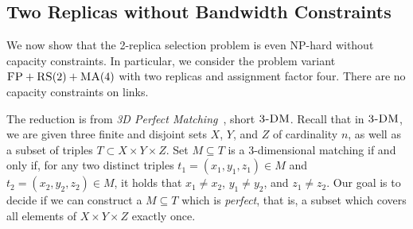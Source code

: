 \documentclass[preprint,12pt]{elsarticle}
\newcommand{\maciek}[1]{\textcolor{brown}{maciek: #1}}
\newcommand{\clauses}{\alpha}
\newcommand{\variables}{\beta}
\newcommand{\FP}{\textsc{FP}}
\newcommand{\RS}{\textsc{RS}}
\newcommand{\MA}{\textsc{MA}}
\newcommand{\TDM}{\textsc{3-DM}}
\begin{document}
%
%
%
%
%
%

\subsection{Two Replicas without Bandwidth Constraints}

We now show that the 2-replica selection problem is even NP-hard
without capacity constraints.  In particular, we consider the problem
variant $\FP+\RS(2)+\MA(4)$ with two replicas and assignment factor
four.  There are no capacity constraints on links.

The reduction is from \emph{3D Perfect Matching}~\cite{3dmatch}, short
$\TDM$.  Recall that in $\TDM$, we are given three finite and disjoint
sets $X$, $Y$, and $Z$ of cardinality $n$, as well as a subset of
triples $T\subset X \times Y \times Z$.  Set $M \subseteq T$ is a
3-dimensional matching if and only if, for any two distinct triples
$t_1=(x_1, y_1, z_1) \in M$ and $t_2=(x_2, y_2, z_2) \in M$, it holds
that $x_1\neq x_2$, $y_1\neq y_2$, and $z_1\neq z_2$. Our goal is to
decide if we can construct a $M \subseteq T$ which is \emph{perfect},
that is, a subset which covers all elements of $X \times Y \times Z$
exactly once.
\end{document}
